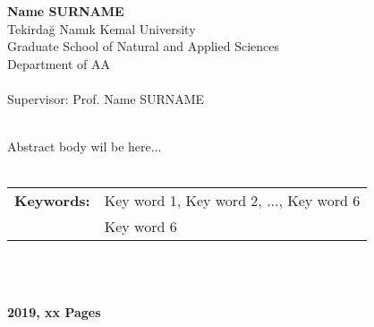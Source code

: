 \begin{center}
	\textbf{Name SURNAME}\\
	Tekirdağ Namık Kemal University\\
	Graduate School of Natural and Applied Sciences\\
	Department of AA\\~\\
	Supervisor: Prof. Name SURNAME
	\\~\\
\end{center}

\hspace{1.25cm}Abstract body wil be here...
\\~\\
\begin{tabular}{ll}
	\textbf{Keywords:}& Key word 1, Key word 2, ..., Key word 6\\
	&Key word 6
\end{tabular}
\\~\\
\begin{center}
	\textbf{2019, xx Pages}
\end{center}